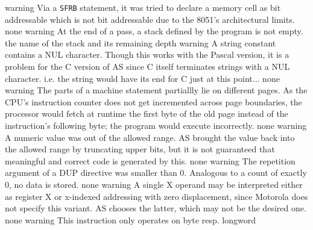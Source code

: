\documentclass[12pt,twoside]{report}
\newcommand{\tty}[1]{{\tt #1}}
\begin{document}
\begin{description}
               {warning}
               {Via a \tty{SFRB} statement, it was tried to declare a memory cell
                as bit addressable which is not bit addressable due to the
                8051's architectural limits.}
               {none}
               {warning}
               {At the end of a pass, a stack defined by the program is
                not empty.}
               {the name of the stack and its remaining depth}
               {warning}
               {A string constant contains a NUL character. Though this
                works with the Pascal version, it is a problem for the
                C version of AS since C itself terminates strings with
                a NUL character. i.e. the string would have its end for
                C just at this point...}
               {none}
               {warning}
               {The parts of a machine statement partiallly lie on
                different pages.  As the CPU's instruction counter does
                not get incremented across page boundaries, the processor
                would fetch at runtime the first byte of the old page
                instead of the instruction's following byte; the program
                would execute incorrectly.}
               {none}
               {warning}
               {A numeric value was out of the allowed range.  AS brought
                the value back into the allowed range by truncating upper
                bits, but it is not guaranteed that meaningful and correct
                code is generated by this.}
               {none}
               {warning}
               {The repetition argument of a DUP directive was smaller
                than 0.  Analogous to a count of exactly 0, no data is
                stored.}
               {none}
               {warning}
               {A single X operand may be interpreted either as register X
                or x-indexed addressing with zero displacement, since
                Motorola does not specify this variant.  AS chooses the
                latter, which may not be the desired one.}
               {none}
               {warning}
               {This instruction only operates on byte resp. longword
}
\end{description}
\end{document}
